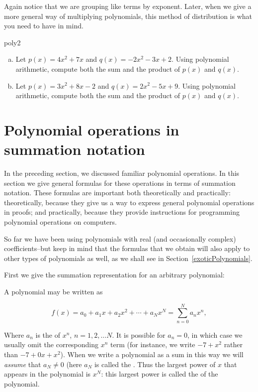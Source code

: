 Again notice that we are grouping like terms by exponent.  Later, when we give a more general way of multiplying polynomials, this method of distribution is what you need to have in mind.


\begin{exercise}{poly2}
\begin{enumerate}[(a)]
\item
Let $p(x)=4x^2+7x$ and $q(x)=-2x^2-3x+2$. Using polynomial arithmetic, compute both the sum and the product of $p(x)$ and $q(x)$.
\item
Let $p(x)=3x^2+8x-2$ and $q(x)=2x^2-5x+9$. Using polynomial arithmetic, compute both the sum and the product of $p(x)$ and $q(x)$. 
\end{enumerate}
\end{exercise}



\section{Polynomial operations in summation notation}\label{Polysum}

In the preceding section, we discussed familiar polynomial operations. In this section we give general formulas for these operations in terms of summation notation. These formulas are important both theoretically and practically: theoretically, because they give us a way to express general polynomial operations in proofs; and practically, because they provide instructions for programming polynomial operations on computers.

So far we have been using polynomials with real (and occasionally complex) coefficients--but keep in mind that the formulas that we obtain will also apply to  other types of polynomials as well, as we shall see in Section~\ref{exoticPolynomials}. 

 First we give the summation representation for an arbitrary polynomial: 

\begin{defn}\label{def:sumPoly}  A polynomial may be written as

\[f(x) = a_0 + a_1 x +a_2 x^2 + \cdots + a_N x^N = \sum^{N}_{n=0} a_n x^n, \]

Where $a_n$  is the   of $x^n$,  $n=1,2, \ldots N$. It is possible for $a_n = 0$, in which case we usually omit the corresponding $x^n$ term (for instance, we write $-7 + x^2 $ rather than $-7 + 0x +  x^2  $). When we write a polynomial as a sum in this way we will \emph{assume} that $a_N \neq 0$ (here $a_N$ is called the .  Thus the largest power of $x$ that appears in the polynomial is $x^N$: this largest power is called the  of the polynomial.
\end{defn}

